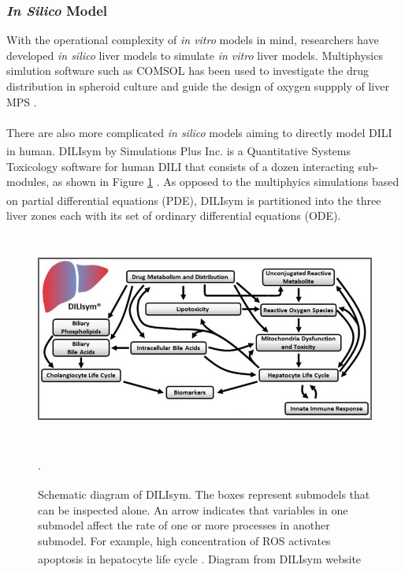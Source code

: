 \documentclass[12pt]{article}
\begin{document}
\subsubsection{\textit{In Silico} Model}
With the operational complexity of \textit{in vitro} models in mind, researchers have developed \textit{in silico} liver models to simulate \textit{in vitro} liver models. Multiphysics simlution software such as COMSOL has been used to investigate the drug distribution in spheroid culture and guide the design of oxygen suppply of liver MPS \cite{leedaleMultiscaleModellingDrug2020,lee-montielControlOxygenTension2017}.\\\\There are also more complicated \textit{in silico} models aiming to directly model DILI in human. DILIsym\textsuperscript{\textregistered} by Simulations Plus Inc. is a Quantitative Systems Toxicology software for human DILI that consists of a dozen interacting sub-modules, as shown in Figure \ref{fig:3} \cite{DILIsymDruginducedLiver}. As opposed to the multiphyics simulations based on partial differential equations (PDE), DILIsym\textsuperscript{\textregistered} is partitioned into the three liver zones each with its set of ordinary differential equations (ODE).

\begin{figure}[h!]
\centering
\includegraphics[width = 14cm, height = 7cm]{dilisym.jpeg}
\caption{Schematic diagram of DILIsym\textsuperscript{\textregistered}. The boxes represent submodels that can be inspected alone. An arrow indicates that variables in one submodel affect the rate of one or more processes in another submodel. For example, high concentration of ROS activates apoptosis in hepatocyte life cycle \cite{finkelSignalTransductionMitochondrial2012}. Diagram from DILIsym\textsuperscript{\textregistered} website \cite{DILIsymDruginducedLiver}}.
\label{fig:3}
\end{figure}
\end{document}
